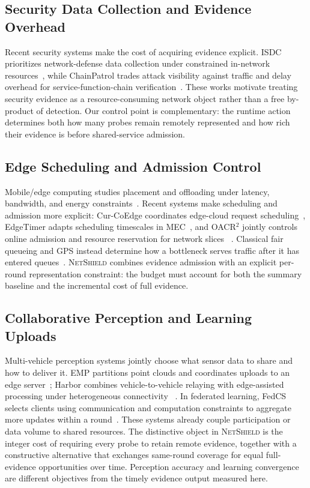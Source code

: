 \documentclass[10pt,journal]{IEEEtran}
\newcommand{\NetShield}{\textsc{NetShield}}
\begin{document}
\subsection{Security Data Collection and Evidence Overhead}
Recent security systems make the cost of acquiring evidence explicit. ISDC
prioritizes network-defense data collection under constrained in-network
resources~\cite{mirnajafizadeh2024isdc}, while ChainPatrol trades attack
visibility against traffic and delay overhead for service-function-chain
verification~\cite{oqaily2024chainpatrol}. These works motivate treating
security evidence as a resource-consuming network object rather than a free
by-product of detection. Our control point is complementary: the runtime
action determines both how many probes remain remotely represented and how
rich their evidence is before shared-service admission.

\subsection{Edge Scheduling and Admission Control}
Mobile/edge computing studies placement and offloading under latency,
bandwidth, and energy constraints~\cite{mao2017mec,mach2017mec}. Recent
systems make scheduling and admission more explicit: Cur-CoEdge coordinates
edge-cloud request scheduling~\cite{zhao2024cur}, EdgeTimer adapts scheduling
timescales in MEC~\cite{hao2024edgetimer}, and OACR$^2$ jointly controls
online admission and resource reservation for network slices
~\cite{li2025oacr2}. Classical fair queueing and GPS instead determine how a
bottleneck serves traffic after it has entered queues~\cite{demers1989fair,
parekh1993gps}. \NetShield{} combines evidence admission with an explicit
per-round representation constraint: the budget must account for both the
summary baseline and the incremental cost of full evidence.

\subsection{Collaborative Perception and Learning Uploads}
Multi-vehicle perception systems jointly choose what sensor data to share
and how to deliver it. EMP partitions point clouds and coordinates uploads
to an edge server~\cite{zhang2021emp}; Harbor combines vehicle-to-vehicle
relaying with edge-assisted processing under heterogeneous connectivity
~\cite{zhu2024harbor}. In federated learning, FedCS selects clients using
communication and computation constraints to aggregate more updates within
a round~\cite{nishio2019fedcs}. These systems already couple participation
or data volume to shared resources. The distinctive object in \NetShield{}
is the integer cost of requiring every probe to retain remote evidence,
together with a constructive alternative that exchanges same-round coverage
for equal full-evidence opportunities over time. Perception accuracy and
learning convergence are different objectives from the timely evidence
output measured here.
\end{document}
